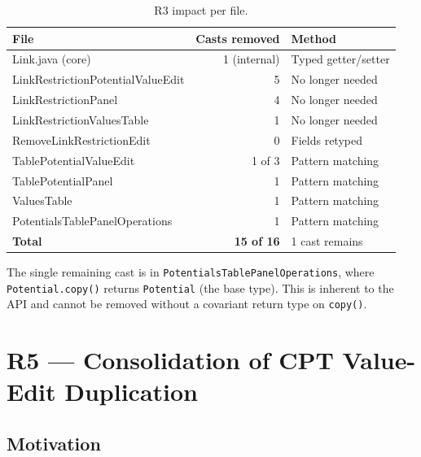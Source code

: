 \documentclass[12pt,a4paper]{article}
\newcommand{\cls}[1]{\texttt{#1}}
\newcommand{\meth}[1]{\texttt{#1}}
\begin{document}
\begin{table}[H]
\centering
\small
\begin{tabular}{lrl}
\toprule
\textbf{File} & \textbf{Casts removed} & \textbf{Method} \\
\midrule
Link.java (core)                      & 1 (internal) & Typed getter/setter \\
LinkRestrictionPotentialValueEdit      & 5 & No longer needed \\
LinkRestrictionPanel                   & 4 & No longer needed \\
LinkRestrictionValuesTable             & 1 & No longer needed \\
RemoveLinkRestrictionEdit              & 0 & Fields retyped \\
TablePotentialValueEdit                & 1 of 3 & Pattern matching \\
TablePotentialPanel                    & 1 & Pattern matching \\
ValuesTable                            & 1 & Pattern matching \\
PotentialsTablePanelOperations         & 1 & Pattern matching \\
\midrule
\textbf{Total}                         & \textbf{15 of 16} & 1 cast remains \\
\bottomrule
\end{tabular}
\caption{R3 impact per file.}
\label{tab:r3-impact}
\end{table}

The single remaining cast is in \cls{PotentialsTablePanelOperations},
where \meth{Potential.copy()} returns \cls{Potential} (the base type).
This is inherent to the API and cannot be removed without a covariant
return type on \meth{copy()}.


\section{R5 --- Consolidation of CPT Value-Edit Duplication}
\label{sec:r5}

\subsection{Motivation}
\end{document}

